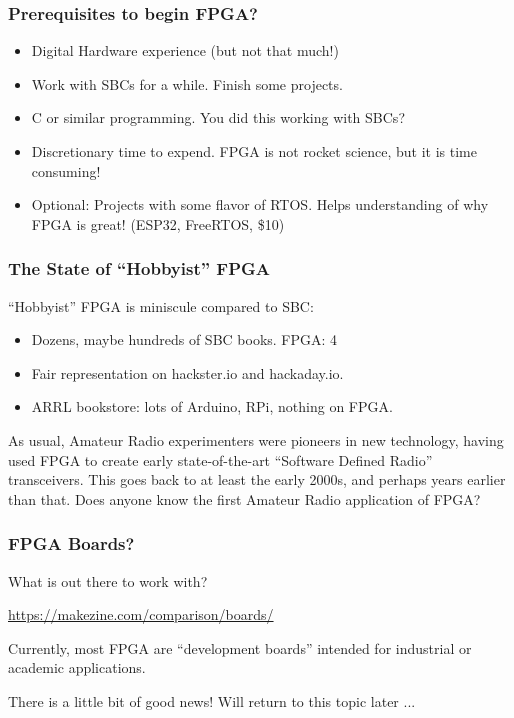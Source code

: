 \documentclass{beamer}
\begin{document}
\begin{frame}
\frametitle{Prerequisites to begin FPGA?}


\begin{itemize}
\item Digital Hardware experience (but not that much!)
\item Work with SBCs for a while.  Finish some projects.
\item C or similar programming.  You did this working with SBCs?
\item Discretionary time to expend.  FPGA is not rocket science, but it is time consuming!
\item Optional:  Projects with some flavor of RTOS.  Helps understanding of why FPGA is great! (ESP32, FreeRTOS, \$10)
\end{itemize}


\end{frame}

\begin{frame}
\frametitle{The State of ``Hobbyist'' FPGA}

``Hobbyist'' FPGA is miniscule compared to SBC:

\begin{itemize}
	\item Dozens, maybe hundreds of SBC books.  FPGA: 4
	\item Fair representation on hackster.io and hackaday.io.
	\item ARRL bookstore: lots of Arduino, RPi, nothing on FPGA.
\end{itemize}

As usual, Amateur Radio experimenters were pioneers in new technology, having used FPGA to create early state-of-the-art ``Software Defined Radio'' transceivers.  This goes back to at least the early 2000s, and perhaps years earlier than that.  Does anyone know the first Amateur Radio application of FPGA? 

\end{frame}

\begin{frame}
\frametitle{FPGA Boards?}

What is out there to work with?

\url{https://makezine.com/comparison/boards/}

Currently, most FPGA are ``development boards'' intended for industrial or academic applications.

There is a little bit of good news!  Will return to this topic later ...

\end{frame}
\end{document}
